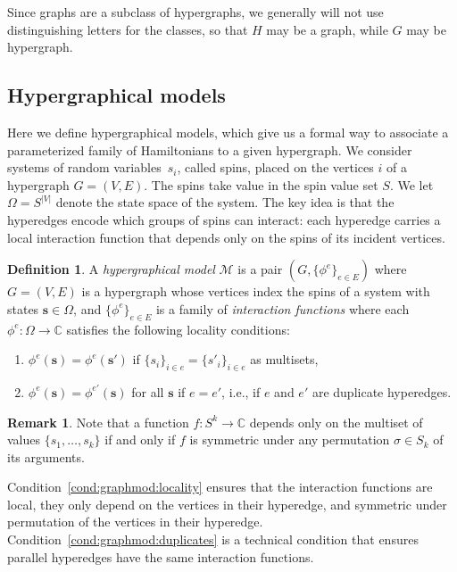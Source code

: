 \documentclass[11pt,reqno]{amsart}
\newcommand{\vecs}{\boldsymbol{s}}
\newcommand{\Mo}{\mathcal{M}}
\newcommand{\statespace}{\Omega}
\newcommand{\sset}{spin value set }
\theoremstyle{plain}
\theoremstyle{definition}
\newtheorem{definition}[theorem]{Definition}
\newtheorem{remark}[theorem]{Remark}
\numberwithin{equation}{section}
\begin{document}
Since graphs are a subclass of hypergraphs, we generally will not use distinguishing letters for the classes, so that $H$ may be a graph, while $G$ may be hypergraph.

\subsection{Hypergraphical models}
Here we define hypergraphical models, which give us a formal way to associate a parameterized family of Hamiltonians to a given hypergraph. We consider systems of random variables~$s_i$, called spins, placed on the vertices $i$ of a hypergraph $G = (V,E)$. The spins take value in the \sset $S$. We let $\statespace = S^{|V|}$ denote the state space of the system. The key idea is that the hyperedges encode which groups of spins can interact: each hyperedge carries a local interaction function that depends only on the spins of its incident vertices.

\begin{definition} \label{def:graphmod}
A \emph{hypergraphical model} $\Mo$ is a pair $(G, \{\phi^e\}_{e \in E})$ where $G = (V, E)$ is a hypergraph whose vertices index the spins of a system with states $\vecs \in \statespace$, and $\{\phi^e\}_{e \in E}$ is a family of \emph{interaction functions} where each $\phi^e \colon \statespace \to \mathbb{C}$ satisfies the following locality conditions:
\begin{enumerate}
    \item\label{cond:graphmod:locality} $\phi^e(\vecs) = \phi^e(\vecs')$ if $\{s_i \}_{i \in e} = \{s'_i \}_{i \in e}$ as multisets,
    
    \item\label{cond:graphmod:duplicates} $\phi^e(\vecs) = \phi^{e'}(\vecs)$ for all $\vecs$ if $e = e'$, i.e., if $e$ and $e'$ are duplicate hyperedges.
\end{enumerate}
\end{definition}
\begin{remark}
    \label{rem:symmetry}
    Note that a function $f: S^k \to \mathbb{C}$ depends only on the multiset of values $\{s_1, \dots, s_k\}$ if and only if $f$ is symmetric under any permutation $\sigma \in S_k$ of its arguments.
\end{remark}
Condition~\ref{cond:graphmod:locality} ensures that the interaction functions are local, they only depend on the vertices in their hyperedge, and symmetric under permutation of the vertices in their hyperedge. Condition~\ref{cond:graphmod:duplicates} is a technical condition that ensures parallel hyperedges have the same interaction functions.
\end{document}
